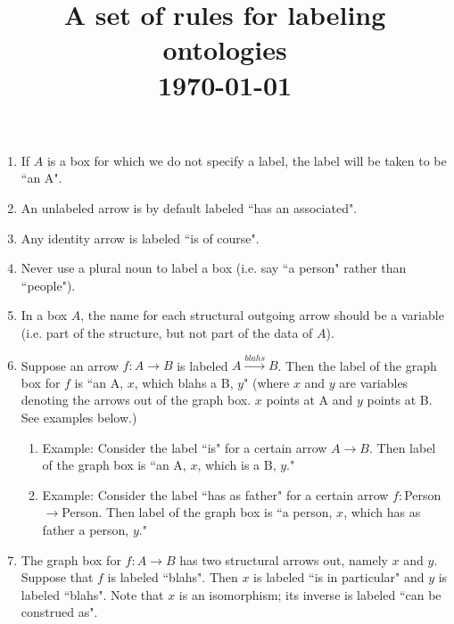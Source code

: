 \documentclass{amsart}
\def\to{\rightarrow}
\def\To{\xrightarrow}
\def\taking{\colon}
\begin{document}
\title{A set of rules for labeling ontologies\\\today}

\maketitle



\begin{enumerate}

\item If $A$ is a box for which we do not specify a label, the label will be taken to be ``an A".

\item An unlabeled arrow is by default labeled ``has an associated".

\item Any identity arrow is labeled ``is of course".

\item Never use a plural noun to label a box (i.e. say ``a person" rather than ``people").

\item In a box $A$, the name for each structural outgoing arrow should be a variable (i.e. part of the structure, but not part of the data of $A$).  

\item Suppose an arrow $f\taking A\to B$ is labeled $A\To{blahs}B$.  Then the label of the graph box for $f$ is ``an A, $x$,  which blahs a B, $y$" (where $x$ and $y$ are variables denoting the arrows out of the graph box.  $x$ points at A and $y$ points at B.  See examples below.)

\begin{enumerate}

\item Example: Consider the label ``is" for a certain arrow $A\to B$.   Then label of the graph box is ``an A, $x$, which is a B, $y$."  

\item Example: Consider the label ``has as father" for a certain arrow $f\taking$Person$\to$Person.  Then label of the graph box is ``a person, $x$, which has as father a person, $y$."

\end{enumerate}

\item The graph box for $f\taking A\to B$ has two structural arrows out, namely $x$ and $y$.  Suppose that $f$ is labeled ``blahs".  Then $x$ is labeled ``is in particular" and $y$ is labeled ``blahs".  Note that $x$ is an isomorphism; its inverse is labeled ``can be construed as".


\end{enumerate}
\end{document}
